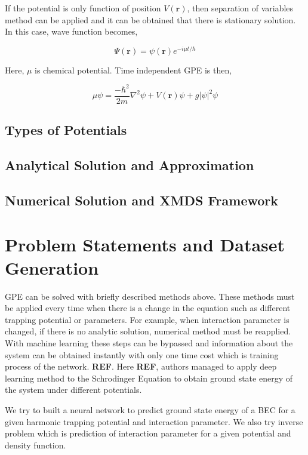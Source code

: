 \documentclass[a4paper,times,12pt]{article}
\begin{document}
If the potential is only function of position $V(\boldsymbol{r})$, then separation of variables method can be applied and it can be obtained that there is stationary solution. In this case, wave function becomes,

\begin{equation}
\label{eq:GPE_time_indep_wave_func}
\Psi(\boldsymbol{r}) = \psi(\boldsymbol{r})e^{-i\mu t/\hbar}
\end{equation}

Here, $\mu$ is chemical potential. Time independent GPE is then,

\begin{equation}
\label{eq:GPE_time_indep}
\mu\psi = \frac{-\hbar^2}{2m}\nabla^2\psi + V(\boldsymbol{r})\psi + g|\psi|^2\psi 
\end{equation}



\subsection{Types of Potentials}
\subsection{Analytical Solution and Approximation}
\subsection{Numerical Solution and XMDS Framework}
\section{Problem Statements and Dataset Generation}

GPE can be solved with briefly described methods above. These methods must be applied every time when there is a change in the equation such as different trapping potential or parameters. For example, when interaction parameter is changed, if there is no analytic solution, numerical method must be reapplied. With machine learning these steps can be bypassed and information about the system can be obtained instantly with only one time cost which is training process of the network. \textbf{REF}. Here \textbf{REF}, authors managed to apply deep learning method to the Schrodinger Equation to obtain ground state energy of the system under different potentials. 

We try to built a neural network to predict ground state energy of a BEC for a given harmonic trapping potential and interaction parameter. We also try inverse problem which is prediction of interaction parameter for a given potential and density function. 
\end{document}
